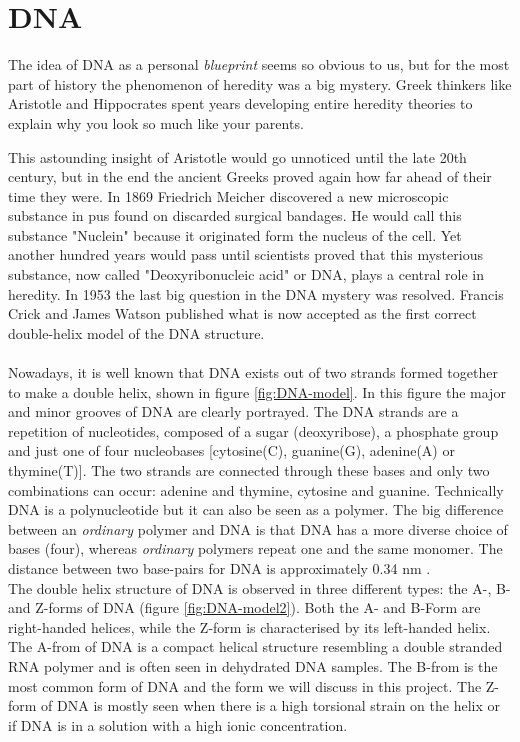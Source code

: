 \section{DNA}


The idea of DNA as a personal \textit{blueprint} seems so obvious to us, but for the most
part of history the phenomenon of heredity was a big mystery. Greek thinkers like
Aristotle and Hippocrates spent years developing entire heredity theories to explain why
you look so much like your parents.

This astounding insight of Aristotle would go unnoticed until the late 20th century, but
in the end the ancient Greeks proved again how far ahead of their time they were. In 1869
Friedrich Meicher discovered a new microscopic substance in pus found on discarded
surgical bandages. He would call this substance "Nuclein" because it originated form the
nucleus of the cell. Yet another hundred years would pass until scientists proved that
this mysterious substance, now called "Deoxyribonucleic acid" or DNA, plays a central
role in heredity. In 1953 the last big question in the DNA mystery was resolved. Francis
Crick  and James Watson published what is now accepted as the first correct double-helix
model of the DNA structure.\\\\

Nowadays, it is well known that DNA exists out of two strands formed together to make a
double helix, shown in figure \ref{fig:DNA-model}. In this figure the major and minor
grooves of DNA are clearly portrayed. The DNA strands are a repetition of nucleotides,
composed of a sugar (deoxyribose), a phosphate group and just one of four nucleobases
[cytosine(C), guanine(G), adenine(A) or thymine(T)]. The two strands are connected
through these bases and only two combinations can occur: adenine and thymine, cytosine
and guanine. Technically DNA is a polynucleotide but it can also be seen as a polymer.
The big difference between an \textit{ordinary} polymer and DNA is that DNA has a more
diverse choice of bases (four), whereas \textit{ordinary} polymers repeat one and the
same monomer. The distance between two base-pairs for DNA is approximately 0.34 nm .\\

The double helix structure of DNA is observed in three different types:  the A-, B- and
Z-forms of DNA (figure \ref{fig:DNA-model2}). Both the A- and B-Form are right-handed
helices, while the Z-form is characterised by its left-handed helix. The A-from of DNA is
a compact helical structure resembling a double stranded RNA polymer and is often seen in
dehydrated DNA samples. The B-from is the most common form of DNA and the form we will
discuss in this project. The Z-form of DNA is mostly seen when there is a high torsional
strain on the helix or if DNA is in a solution with a high ionic concentration.


